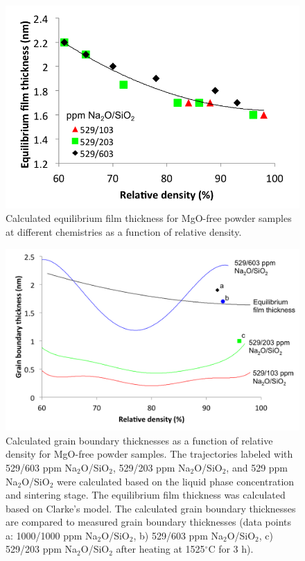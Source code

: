 \newpage
\begin{figure}[H]
	\centering
	\includegraphics[width=\textwidth]{Chapter-4/Figures/Figure6.png}
	\caption{Calculated equilibrium film thickness for MgO-free powder samples at different chemistries as a function of relative density.}
	\label{Ch4-figure:Figure6}
\end{figure}

\newpage
\begin{figure}[H]
	\centering
	\includegraphics[width=\textwidth]{Chapter-4/Figures/Figure7.png}
	\caption{Calculated grain boundary thicknesses as a function of relative density for MgO-free powder samples. The trajectories labeled with 529/603 ppm Na$_{2}$O/SiO$_{2}$, 529/203 ppm Na$_{2}$O/SiO$_{2}$, and 529 ppm Na$_{2}$O/SiO$_{2}$ were calculated based on the liquid phase concentration and sintering stage. The equilibrium film thickness was calculated based on Clarke's model. The calculated grain boundary thicknesses are compared to measured grain boundary thicknesses (data points a: 1000/1000 ppm Na$_{2}$O/SiO$_{2}$, b) 529/603 ppm Na$_{2}$O/SiO$_{2}$, c) 529/203 ppm Na$_{2}$O/SiO$_{2}$ after heating at 1525$^{\circ}$C for 3 h).}
	\label{Ch4-figure:Figure7}
\end{figure}

